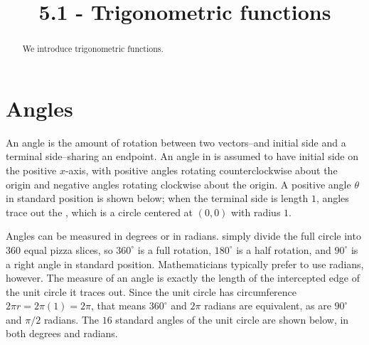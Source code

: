 \documentclass{ximera}
\title{5.1 - Trigonometric functions}
\begin{document}
\begin{abstract}
  We introduce trigonometric functions.
\end{abstract}
\maketitle


\section{Angles}
An angle is the amount of rotation between two vectors--and initial side and a terminal side--sharing an endpoint. An angle in  is assumed to have initial side on the positive $x$-axis, with positive angles rotating counterclockwise about the origin and negative angles rotating clockwise about the origin. A positive angle $\theta$ in standard position is shown below; when the terminal side is length $1$, angles trace out the , which is a circle centered at $(0,0)$ with radius $1$.

\begin{image}[2in]
\end{image}

Angles can be measured in degrees or in radians.  simply divide the full circle into $360$ equal pizza slices, so $360^{\circ}$ is a full rotation, $180^{\circ}$ is a half rotation, and $90^{\circ}$ is a right angle in standard position. Mathematicians typically prefer to use radians, however. The  measure of an angle is exactly the length of the intercepted edge of the unit circle it traces out. Since the unit circle has circumference $2\pi r=2\pi(1)=2\pi$, that means $360^{\circ}$ and $2\pi$ radians are equivalent, as are $90^{\circ}$ and $\pi/2$ radians.  The $16$ standard angles of the unit circle are shown below, in both degrees and radians.
\end{document}
